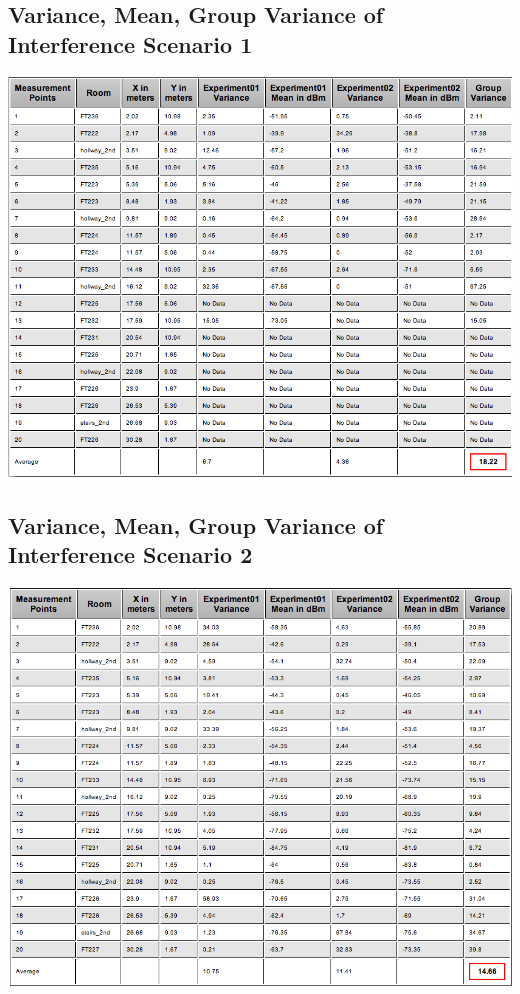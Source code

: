 \documentclass[11pt,a4paper,headinclude,footinclude,chapterprefix=on]{scrreprt}
\begin{document}
\subsection{Variance, Mean, Group Variance of Interference Scenario 1} 
\includegraphics[width=15cm]{../../Source/plot/data/d9_int1.png} 
\subsection{Variance, Mean, Group Variance of Interference Scenario 2} 
\includegraphics[width=15cm]{../../Source/plot/data/d9_int2.png}

\pagebreak 
\end{document}
